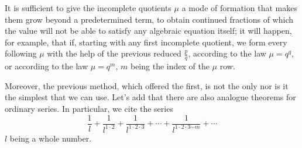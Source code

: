 \documentclass{article}
\begin{document}
\begin{displayquote}
  It is sufficient to give the incomplete quotients $\mu$ a mode of formation
  that makes them grow beyond a predetermined term, to obtain continued
  fractions of which the value will not be able to satisfy any algebraic
  equation itself; it will happen, for example, that if, starting with any first
  incomplete quotient, we form every following $\mu$ with the help of the
  previous reduced $\frac{p}{q}$, according to the law $\mu = q^q$, or according
  to the law $\mu = q^m$, $m$  being the index of the $\mu$ row.

  Moreover, the previous method, which offered the first, is not the only nor
  is it the simplest that we can use. Let’s add that there are also analogue
  theorems for ordinary series. In particular, we cite the series
    $$\frac{1}{l} + \frac{1}{l^{1 \cdot 2}} + \frac{1}{l^{1\cdot 2\cdot 3}}
      + \cdots + \frac{1}{l^{1\cdot 2\cdot 3\cdots m}} + \cdots$$
  $l$ being a whole number.
\end{displayquote}
\end{document}
